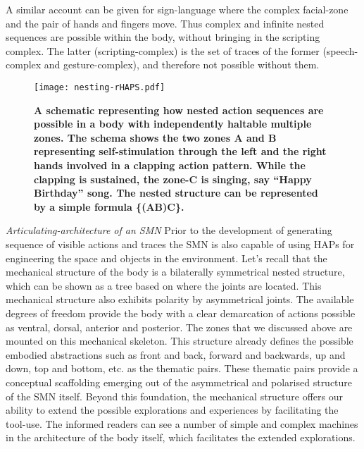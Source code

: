 A similar account can be given for sign-language where the complex facial-zone and the pair of hands and fingers move. Thus complex and infinite nested sequences are possible within the body, without bringing in the scripting complex. The latter (scripting-complex) is the set of traces of the former (speech-complex and gesture-complex), and therefore not possible without them.
 
\begin{figure}[ht] 
\texttt{[image: nesting-rHAPS.pdf]}
\caption{\color{Gray} \textbf{A schematic representing how nested action sequences are possible in a body with independently haltable multiple zones. The schema shows the two zones A and B representing self-stimulation through the left and the right hands involved in a clapping action pattern. While the clapping is sustained, the zone-C is singing, say ``Happy Birthday'' song. The nested structure can be represented by a simple formula \{(AB)C\}. }}
\label{nesting} %
\end{figure}

\emph{Articulating-architecture of an SMN} Prior to the development of generating sequence of visible actions and traces the SMN is also capable of using HAPs for engineering the space and objects in the environment. Let's recall that the mechanical structure of the body is a bilaterally symmetrical nested structure, which can be shown as a tree based on where the joints are located. This mechanical structure also exhibits polarity by asymmetrical joints. The available degrees of freedom provide the body with a clear demarcation of actions possible as ventral, dorsal, anterior and posterior. The zones that we discussed above are mounted on this mechanical skeleton. This structure already defines the possible embodied abstractions such as front and back, forward and backwards, up and down, top and bottom, etc. as the thematic pairs. These thematic pairs provide a conceptual scaffolding emerging out of the asymmetrical and polarised structure of the SMN itself. Beyond this foundation, the mechanical structure offers our ability to extend the possible explorations and experiences by facilitating the tool-use. The informed readers can see a number of simple and complex machines in the architecture of the body itself, which facilitates the extended explorations.

